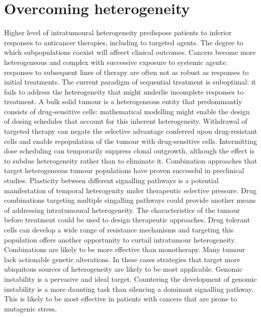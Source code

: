\section{Overcoming heterogeneity}
Higher level of intratumoural heterogeneity predispose patients to inferior responses to anticancer therapies, including to targeted agents.
The degree to which subpopulations coexist will affeect clinical outcomes.
Cancers become more heterogeneous and complex with successive exposure to systemic agents: responses to subsequent lines of therapy are often not as robust as responses to initial treatments.
The current paradigm of sequential treatment is suboptimal: it fails to address the heterogeneity that might underlie incomplete responses to treatment.
A bulk solid tumour is a heterogeneous entity that predominantly consists of drug-sensitive cells: mathematical modelling might enable the design of dosing schedules that account for this inherent heterogeneity.
Withdrawal of targeted therapy can negate the selective advantage conferred upon drug-resistant cells and enable repopulation of the tumour with drug-sensitive cells.
Intermitting dose scheduling can temporarily suppress clonal outgrowth, although the effect is to subdue heterogeneity rather than to eliminate it.
Combination approaches that target heterogeneous tumour populations have proven successful in preclinical studies.
Plasticity between different signalling pathways is a potential manifestation of temporal heterogenity under therapeutic selective pressure.
Drug combinations targeting multiple singalling pathways could provide another means of addressing intratumoural heterogeneity.
The characteristics of the tumour before treatment could be used to design therapeutic approaches.
Drug tolerant cells can develop a wide range of resistance mechanisms and targeting this population offers another opportunity to curtail intratumour heterogeneity.
Combinations are likely to be more effective than monotherapy.
Many tumour lack actionable genetic alterations.
In these cases strategies that target more ubiquitous sources of heterogeneity are likely to be most applicable.
Genomic instability is a pervasive and ideal target.
Countering the development of genomic instability is a more daunting task than silencing a dominant signalling pathway.
This is likely to be most effective in patients with cancers that are prone to mutagenic stress.
